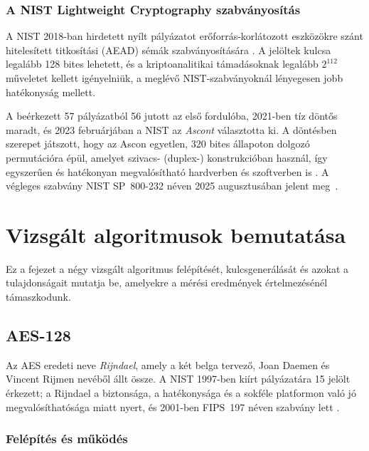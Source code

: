 \documentclass[a4paper,12pt]{report}
\theoremstyle{definition}
\theoremstyle{remark}
\begin{document}
\subsection{A NIST Lightweight Cryptography szabványosítás}

A NIST 2018-ban hirdetett nyílt pályázatot erőforrás-korlátozott eszközökre szánt hitelesített titkosítási (AEAD) sémák szabványosítására \cite{NISTLWC2023}. A jelöltek kulcsa legalább 128 bites lehetett, és a kriptoanalitikai támadásoknak legalább $2^{112}$ műveletet kellett igényelniük, a meglévő NIST-szabványoknál lényegesen jobb hatékonyság mellett.

A beérkezett 57 pályázatból 56 jutott az első fordulóba, 2021-ben tíz döntős maradt, és 2023 februárjában a NIST az \emph{Ascont} választotta ki. A döntésben szerepet játszott, hogy az Ascon egyetlen, 320 bites állapoton dolgozó permutációra épül, amelyet szivacs- (duplex-) konstrukcióban használ, így egyszerűen és hatékonyan megvalósítható hardverben és szoftverben is \cite{Dobraunig2021}. A végleges szabvány NIST SP~800-232 néven 2025 augusztusában jelent meg~\cite{NISTSP800232}.

\chapter{Vizsgált algoritmusok bemutatása}\label{chap:algoritmusok}

Ez a fejezet a négy vizsgált algoritmus felépítését, kulcsgenerálását és azokat a tulajdonságait mutatja be, amelyekre a mérési eredmények értelmezésénél támaszkodunk.

\section{AES-128}\label{sec:aes}

Az AES eredeti neve \emph{Rijndael}, amely a két belga tervező, Joan Daemen és Vincent Rijmen nevéből állt össze. A NIST 1997-ben kiírt pályázatára 15 jelölt érkezett; a Rijndael a biztonsága, a hatékonysága és a sokféle platformon való jó megvalósíthatósága miatt nyert, és 2001-ben FIPS~197 néven szabvány lett \cite{FIPS197,DaemenRijmen2002}.

\subsection{Felépítés és működés}\label{sec:aes_struktura}
\end{document}
